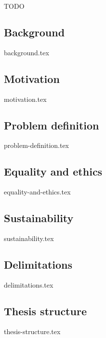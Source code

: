 TODO


\subsection{Background}
{background.tex}

\subsection{Motivation}
{motivation.tex}

\subsection{Problem definition}
{problem-definition.tex}

\subsection{Equality and ethics}
{equality-and-ethics.tex}

\subsection{Sustainability}
{sustainability.tex}

\subsection{Delimitations}
{delimitations.tex}

\subsection{Thesis structure}
{thesis-structure.tex}


